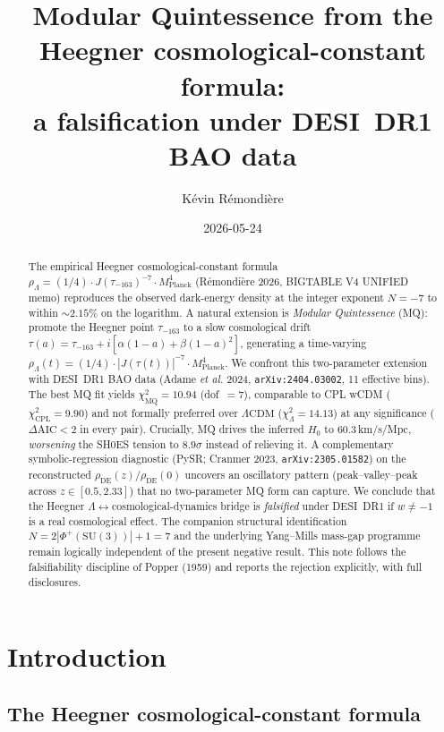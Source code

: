 \documentclass[11pt,letterpaper,twoside]{article}
\title{\bfseries Modular Quintessence from the Heegner cosmological-constant formula:\\
       a falsification under DESI~DR1 BAO data}
\author[1]{K\'evin R\'emondi\`ere}
\affil[1]{Independent researcher, Oloron-Sainte-Marie, France\\
          ORCID: \href{https://orcid.org/0009-0008-2443-7166}{0009-0008-2443-7166}\\
          \texttt{kevin.remondiere@gmail.com}}
\date{2026-05-24}
\newcommand{\Mpl}{M_{\mathrm{Planck}}}
\newcommand{\Lcdm}{\Lambda\mathrm{CDM}}
\newcommand{\rDE}{\rho_{\mathrm{DE}}}
\newcommand{\SUthree}{\mathrm{SU}(3)}
\newcommand{\Heegner}{\tau_{-163}}
\begin{document}
\maketitle

\begin{abstract}\small\noindent
The empirical Heegner cosmological-constant formula
$\rho_{\Lambda}=(1/4)\cdot J(\Heegner)^{-7}\cdot \Mpl^{4}$
(R\'emondi\`ere 2026, BIGTABLE V4 UNIFIED memo) reproduces the observed dark-energy
density at the integer exponent $N=-7$ to within $\sim2.15\%$ on the logarithm.
A natural extension is \emph{Modular Quintessence} (MQ): promote the Heegner
point $\Heegner$ to a slow cosmological drift
$\tau(a)=\Heegner+i[\alpha(1-a)+\beta(1-a)^{2}]$, generating a time-varying
$\rho_{\Lambda}(t)=(1/4)\cdot|J(\tau(t))|^{-7}\cdot\Mpl^{4}$.
We confront this two-parameter extension with DESI~DR1 BAO data
(Adame \emph{et al.} 2024, \texttt{arXiv:2404.03002}, 11 effective bins).
The best MQ fit yields $\chi^{2}_{\mathrm{MQ}}=10.94$ (dof~$=7$), comparable to
CPL wCDM ($\chi^{2}_{\mathrm{CPL}}=9.90$) and not formally preferred over
$\Lcdm$ ($\chi^{2}_{\Lambda}=14.13$) at any significance
($\Delta\mathrm{AIC}<2$ in every pair).
Crucially, MQ drives the inferred $H_{0}$ to $60.3$\,km/s/Mpc,
\emph{worsening} the SH0ES tension to $8.9\sigma$ instead of relieving it.
A complementary symbolic-regression diagnostic
(PySR; Cranmer 2023, \texttt{arXiv:2305.01582}) on the reconstructed
$\rDE(z)/\rDE(0)$ uncovers an oscillatory pattern (peak--valley--peak across
$z\in[0.5,2.33]$) that no two-parameter MQ form can capture.
We conclude that the Heegner $\Lambda\!\leftrightarrow\!$cosmological-dynamics
bridge is \emph{falsified} under DESI~DR1 if $w\neq-1$ is a real cosmological
effect.
The companion structural identification
$N=2|\Phi^{+}(\SUthree)|+1=7$ and the underlying Yang--Mills mass-gap
programme remain logically independent of the present negative result.
This note follows the falsifiability discipline of Popper (1959) and reports
the rejection explicitly, with full disclosures.
\end{abstract}

\section{Introduction}\label{sec:intro}

\subsection{The Heegner cosmological-constant formula}\label{sec:bg}
\end{document}
